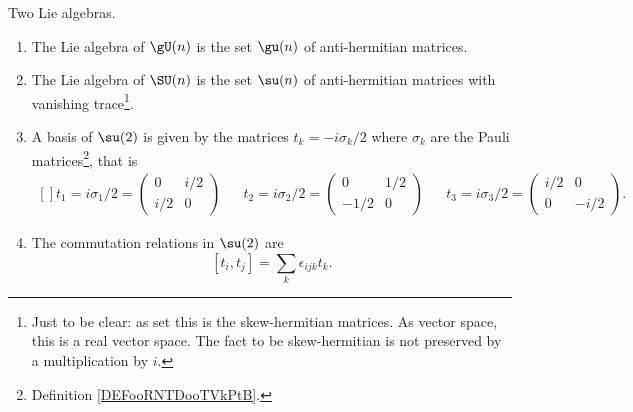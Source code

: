 \begin{proposition}     \label{PROPooHOOLooOrcquD}
    Two Lie algebras.
    \begin{enumerate}
        \item       \label{ITEMooFSTMooGSjovL}
    The Lie algebra of \( \gU(n)\) is the set \( \gu(n)\) of anti-hermitian matrices.
\item       \label{ITEMooYEFMooRmGmlF}
    The Lie algebra of \( \SU(n)\) is the set \( \su(n)\) of anti-hermitian matrices with vanishing trace\footnote{Just to be clear: as set this is the skew-hermitian matrices. As vector space, this is a real vector space. The fact to be skew-hermitian is not preserved by a multiplication by \( i\).}.
\item           \label{ITEMooXXTRooQZzCfs}
    A basis of \( \su(2)\) is given by the matrices \( t_k=-i\sigma_k/2\) where \( \sigma_k\) are the Pauli matrices\footnote{Definition \ref{DEFooRNTDooTVkPtB}.}, that is
    \begin{equation}
        \begin{aligned}[]
            t_1=i\sigma_1/2=\begin{pmatrix}
                0    &   i/2    \\ 
                i/2    &   0    
            \end{pmatrix}&&t_2=i\sigma_2/2=\begin{pmatrix}
                0    &   1/2    \\ 
                -1/2    &   0    
            \end{pmatrix}&&t_3=i\sigma_3/2=\begin{pmatrix}
                i/2    &   0    \\ 
                0    &   -i/2    
            \end{pmatrix}.
        \end{aligned}
    \end{equation}
\item
    The commutation relations in \( \su(2)\) are
    \begin{equation}        \label{EQooFJIDooRtQGjA}
        [t_i,t_j]=\sum_k\epsilon_{ijk}t_k.
    \end{equation}
    \end{enumerate}
\end{proposition}


